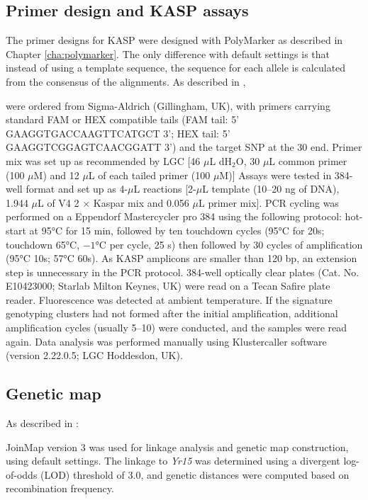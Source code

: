 \subsection{Primer design and KASP assays}
The primer designs for KASP were designed with PolyMarker as described in Chapter \ref{cha:polymarker}. 
The only difference with default settings is that instead of using a template sequence, the sequence for each allele is calculated from the consensus of the alignments. 
As described in \citet{Ramirez-Gonzalez2015b}, 
\begin{blockquote}  were ordered from Sigma-Aldrich (Gillingham, UK), with primers carrying standard FAM or HEX compatible tails (FAM tail: 5' GAAGGTGACCAAGTTCATGCT 3'; HEX tail: 5' GAAGGTCGGAGTCAACGGATT 3') and the target SNP at the 30 end. 
Primer mix was set up as recommended by LGC [46 $\mu$L dH$_{2}$O, 30 $\mu$L common primer (100 $\mu$M) and 12 $\mu$L of each tailed primer (100 $\mu$M)] \citep{LGC}
Assays were tested in 384-well format and set up as 4-$\mu$L reactions [2-$\mu$L template (10–20 ng of DNA), 1.944 $\mu$L of V4 2 $\times$ Kaspar mix and 0.056 $\mu$L primer mix]. 
PCR cycling was performed on a Eppendorf Mastercycler pro 384 using the following protocol: hot-start at 95°C for 15 min, followed by ten touchdown cycles (95°C for 20s; touchdown 65°C, $-1$°C per cycle, 25 s) then followed by 30 cycles of amplification (95°C 10s; 57°C 60s).
As KASP amplicons are smaller than 120 bp, an extension step is unnecessary in the PCR protocol. 384-well optically clear plates (Cat. No. E10423000; Starlab Milton Keynes, UK) were read on a Tecan Safire plate reader. 
Fluorescence was detected at ambient temperature. If the signature genotyping clusters had not formed after the initial amplification, additional amplification cycles (usually 5–10) were conducted, and the samples were read again. Data analysis was performed manually using Klustercaller software (version 2.22.0.5; LGC Hoddesdon, UK).
\end{blockquote}


\subsection{Genetic map}
As described in \citet{Ramirez-Gonzalez2015b}:
\begin{blockquote}
 JoinMap version 3 \citep{vanOoijen2002} was used for linkage analysis and genetic map construction, using default settings. The linkage to \textit{Yr15} was determined using a divergent log-of-odds (LOD) threshold of 3.0, and genetic distances were computed based on recombination frequency. 
\end{blockquote}

